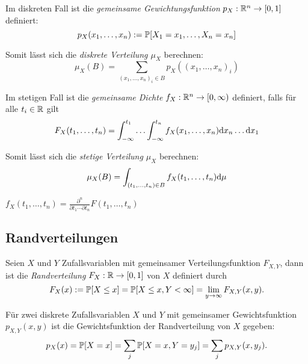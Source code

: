 \begin{definition}
	Im diskreten Fall ist die \emph{gemeinsame Gewichtungsfunktion} \(p_X:\R^n\rightarrow [0,1]\) definiert:
	\[		p_X(x_1,\ldots,x_n) := \P[X_1=x_1,\ldots,X_n=x_n]	\]

	Somit lässt sich die \emph{diskrete Verteilung \(\mu_X\)} berechnen:
	\[\mu_X(B) = \sum_{ (x_1, \ldots, x_n)_i \in B } p_X( (x_1, \ldots, x_n)_i ) \]

\end{definition}


\begin{definition}
	Im stetigen Fall ist die \emph{gemeinsame Dichte} \(f_X : \R^n \rightarrow [0,\infty)\) definiert, falls für alle \(t_i \in \R\) gilt
	\[
		F_X(t_1,\ldots,t_n) = \int_{-\infty}^{t_1} \ldots \int_{-\infty}^{t_n} f_X(x_1,\ldots,x_n) \d x_n \ldots \d x_1
	\]

	Somit lässt sich die \emph{stetige Verteilung \(\mu_X\)} berechnen:
	\[\mu_X(B) = \int_{ (t_1, \ldots, t_n)   \in B } f_X(t_1,\ldots,t_n) \d\mu \]


	\begin{note}
		\(f_X(t_1,\ldots,t_n) = \frac{\partial^n}{\partial t_1 \cdots \partial t_n} F(t_1,\ldots,t_n)\)
	\end{note}

\end{definition}




\subsection{Randverteilungen}

\begin{definition}[Randverteilung]

	Seien \(X\) und \(Y\) Zufallsvariablen mit gemeinsamer Verteilungsfunktion \(F_{X,Y}\),
	dann ist die \emph{Randverteilung} \(F_X:\R \rightarrow [0,1]\) von \(X\) definiert durch
	\[
		F_X(x) := \P[X \leq x] = \P[X \leq x, Y < \infty] = \lim_{y\rightarrow\infty}F_{X,Y}(x,y).
	\]
\end{definition}

\begin{definition}[Randgewichtsfunktion]

	Für zwei diskrete Zufallsvariablen \(X\) und \(Y\) mit gemeinsamer Gewichtsfunktion \(p_{X,Y}(x,y)\)
	ist die Gewichtsfunktion der Randverteilung von \(X\) gegeben:
	\[
		p_X(x) =
		\P[X=x] =
		\sum_j \P[X=x,Y=y_j] =
		\sum_j p_{X,Y}(x,y_j).
	\]
\end{definition}

